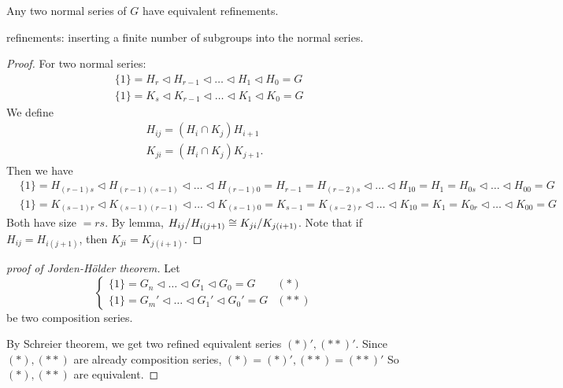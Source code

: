 \begin{theorem}
  Any two normal series of $G$ have equivalent refinements.

  refinements: inserting a finite number of subgroups into the normal series.
  \begin{proof}
    For two normal series:
    \begin{align*}
      & \{1\} = H_r \lhd H_{r-1} \lhd \dots \lhd H_1 \lhd H_0 = G \\
      & \{1\} = K_s \lhd K_{r-1} \lhd \dots \lhd K_1 \lhd K_0 = G
    \end{align*}
    We define
    \begin{align*}
      H_{ij} = (H_i \cap K_j)H_{i+1} \\
      K_{ji} = (H_i \cap K_j)K_{j+1}.
    \end{align*}
    Then we have
    \begin{align*}
      & \{1\} = H_{(r-1)s} \lhd H_{(r-1)(s-1)} \lhd \dots \lhd
      H_{(r-1)0} = H_{r-1} = H_{(r-2)s} \lhd \dots \lhd
      H_{10} = H_1 = H_{0s} \lhd \dots \lhd H_{00} = G \\
      & \{1\} = K_{(s-1)r} \lhd K_{(s-1)(r-1)} \lhd \dots \lhd
      K_{(s-1)0} = K_{s-1} = K_{(s-2)r} \lhd \dots \lhd
      K_{10} = K_1 = K_{0r} \lhd \dots \lhd K_{00} = G
    \end{align*}
    Both have size $= rs$. By lemma,
    ${H_{ij}}/{H_{i(j+1)}} \cong {K_{ji}}/{K_{j(i+1)}}$.
    Note that if $H_{ij} = H_{i(j+1)}$, then $K_{ji} = K_{j(i+1)}$.
  \end{proof}
\end{theorem}

\begin{proof}[proof of Jorden-H\"older theorem]
  Let 
  \[
  \begin{cases}
    \{1\} = G_n \lhd \dots \lhd G_1 \lhd G_0 = G  & (*)\\
    \{1\} = G_m' \lhd \dots \lhd G_1' \lhd G_0' = G & (**)
  \end{cases}
  \]
  be two composition series.

  By Schreier theorem, we get two refined equivalent series $(*)', (**)'$.
  Since $(*), (**)$ are already composition series, $(*)=(*)', (**)=(**)'$
  So $(*), (**)$ are equivalent.
\end{proof}

